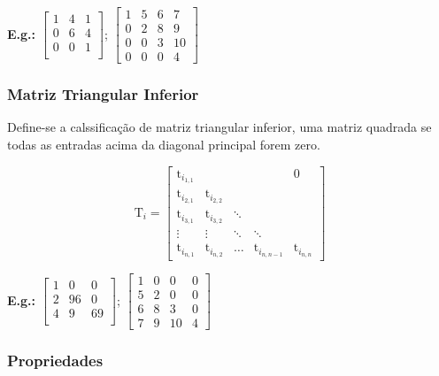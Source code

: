 \documentclass[a4paper,12pt]{article}
\begin{document}
\textbf{E.g.:} $ \begin{bmatrix}
  1 & 4 & 1 \\
  0 & 6 & 4 \\
  0 & 0 & 1 \\
\end{bmatrix} $; $ \begin{bmatrix}
1 & 5 & 6 & 7 \\
0 & 2 & 8 & 9 \\
0 & 0 & 3 & 10 \\
0 & 0 & 0 & 4
\end{bmatrix} $

\subsubsection{Matriz Triangular Inferior}

Define-se a calssificação de matriz triangular inferior, uma matriz quadrada se todas as entradas acima da diagonal principal forem zero.

$$
\text{T}_{i} = \begin{bmatrix}
  \text{t}_{i_{1,1}} &            &        &              &          0 \\
  \text{t}_{i_{2,1}} & \text{t}_{i_{2,2}} &        &              &            \\
  \text{t}_{i_{3,1}} & \text{t}_{i_{3,2}} & \ddots &              &            \\
      \vdots &     \vdots & \ddots &       \ddots &            \\
  \text{t}_{i_{n,1}} & \text{t}_{i_{n,2}} & \ldots & \text{t}_{i_{n,n-1}} & \text{t}_{i_{n,n}}
\end{bmatrix}
$$

\textbf{E.g.:} $ \begin{bmatrix}
  1 & 0 & 0 \\
  2 & 96 & 0 \\
  4 & 9 & 69 \\
\end{bmatrix} $;  $ \begin{bmatrix}
1 & 0 & 0 & 0 \\
5 & 2 & 0 & 0 \\
6 & 8 & 3 & 0 \\
7 & 9 & 10 & 4
\end{bmatrix} $

\subsubsection{Propriedades}
\end{document}

